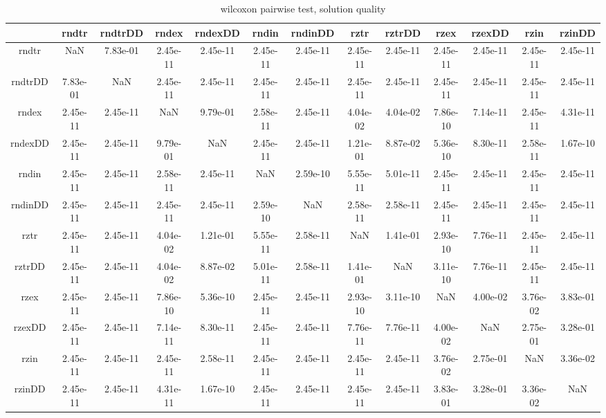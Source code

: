 \documentclass[12pt,a4paper]{article}
\begin{document}
\begin{table}[!h]
\leftskip -1.9cm
{
\scriptsize
\begin{tabular}{|*{13}{c|}}
\hline
~ & rndtr & rndtrDD & rndex & rndexDD & rndin & rndinDD & rztr & rztrDD & rzex & rzexDD & rzin & rzinDD \\
\hline
rndtr & NaN & 7.83e-01 & 2.45e-11 & 2.45e-11 & 2.45e-11 & 2.45e-11 & 2.45e-11 & 2.45e-11 & 2.45e-11 & 2.45e-11 & 2.45e-11 & 2.45e-11 \\
rndtrDD & 7.83e-01 & NaN & 2.45e-11 & 2.45e-11 & 2.45e-11 & 2.45e-11 & 2.45e-11 & 2.45e-11 & 2.45e-11 & 2.45e-11 & 2.45e-11 & 2.45e-11 \\
rndex & 2.45e-11 & 2.45e-11 & NaN & 9.79e-01 & 2.58e-11 & 2.45e-11 & 4.04e-02 & 4.04e-02 & 7.86e-10 & 7.14e-11 & 2.45e-11 & 4.31e-11 \\
rndexDD & 2.45e-11 & 2.45e-11 & 9.79e-01 & NaN & 2.45e-11 & 2.45e-11 & 1.21e-01 & 8.87e-02 & 5.36e-10 & 8.30e-11 & 2.58e-11 & 1.67e-10 \\
rndin & 2.45e-11 & 2.45e-11 & 2.58e-11 & 2.45e-11 & NaN & 2.59e-10 & 5.55e-11 & 5.01e-11 & 2.45e-11 & 2.45e-11 & 2.45e-11 & 2.45e-11 \\
rndinDD & 2.45e-11 & 2.45e-11 & 2.45e-11 & 2.45e-11 & 2.59e-10 & NaN & 2.58e-11 & 2.58e-11 & 2.45e-11 & 2.45e-11 & 2.45e-11 & 2.45e-11 \\
rztr & 2.45e-11 & 2.45e-11 & 4.04e-02 & 1.21e-01 & 5.55e-11 & 2.58e-11 & NaN & 1.41e-01 & 2.93e-10 & 7.76e-11 & 2.45e-11 & 2.45e-11 \\
rztrDD & 2.45e-11 & 2.45e-11 & 4.04e-02 & 8.87e-02 & 5.01e-11 & 2.58e-11 & 1.41e-01 & NaN & 3.11e-10 & 7.76e-11 & 2.45e-11 & 2.45e-11 \\
rzex & 2.45e-11 & 2.45e-11 & 7.86e-10 & 5.36e-10 & 2.45e-11 & 2.45e-11 & 2.93e-10 & 3.11e-10 & NaN & 4.00e-02 & 3.76e-02 & 3.83e-01 \\
rzexDD & 2.45e-11 & 2.45e-11 & 7.14e-11 & 8.30e-11 & 2.45e-11 & 2.45e-11 & 7.76e-11 & 7.76e-11 & 4.00e-02 & NaN & 2.75e-01 & 3.28e-01 \\
rzin & 2.45e-11 & 2.45e-11 & 2.45e-11 & 2.58e-11 & 2.45e-11 & 2.45e-11 & 2.45e-11 & 2.45e-11 & 3.76e-02 & 2.75e-01 & NaN & 3.36e-02 \\
rzinDD & 2.45e-11 & 2.45e-11 & 4.31e-11 & 1.67e-10 & 2.45e-11 & 2.45e-11 & 2.45e-11 & 2.45e-11 & 3.83e-01 & 3.28e-01 & 3.36e-02 & NaN \\

\hline
\end{tabular}
\normalsize
}
\caption{wilcoxon pairwise test, solution quality}
\label{wilcoxon pairwise test, solution quality}
\end{table}
\end{document}

